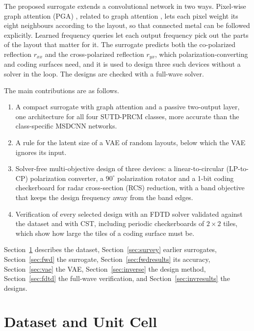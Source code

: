 \documentclass[journal]{IEEEtran}
\begin{document}
The proposed surrogate extends a convolutional network in two ways. Pixel-wise graph attention (PGA) \cite{pganet}, related to graph attention \cite{gat}, lets each pixel weight its eight neighbours according to the layout, so that connected metal can be followed explicitly. Learned frequency queries \cite{edgeaware,vaswani} let each output frequency pick out the parts of the layout that matter for it. The surrogate predicts both the co-polarized reflection $r_{xx}$ and the cross-polarized reflection $r_{yx}$, which polarization-converting and coding surfaces need, and it is used to design three such devices without a solver in the loop. The designs are checked with a full-wave solver.

The main contributions are as follows.
\begin{enumerate}
\item A compact surrogate with graph attention and a passive two-output layer, one architecture for all four SUTD-PRCM classes, more accurate than the class-specific MSDCNN networks.
\item A rule for the latent size of a VAE of random layouts, below which the VAE ignores its input.
\item Solver-free multi-objective design of three devices: a linear-to-circular (LP-to-CP) polarization converter, a $90^\circ$ polarization rotator and a 1-bit coding checkerboard for radar cross-section (RCS) reduction, with a band objective that keeps the design frequency away from the band edges.
\item Verification of every selected design with an FDTD solver validated against the dataset and with CST, including periodic checkerboards of $2\times2$ tiles, which show how large the tiles of a coding surface must be.
\end{enumerate}

Section~\ref{sec:datasets} describes the dataset, Section~\ref{sec:survey} earlier surrogates, Section~\ref{sec:fwd} the surrogate, Section~\ref{sec:fwdresults} its accuracy, Section~\ref{sec:vae} the VAE, Section~\ref{sec:inverse} the design method, Section~\ref{sec:fdtd} the full-wave verification, and Section~\ref{sec:invresults} the designs.

\section{Dataset and Unit Cell}\label{sec:datasets}
\end{document}

